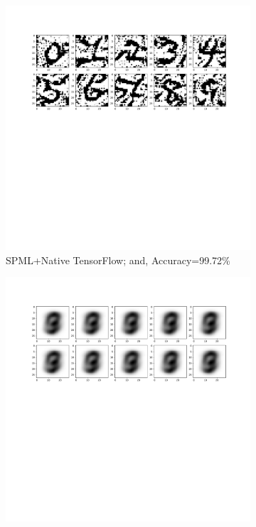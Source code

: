 \begin{figure}
\begin{subfigure}{.325\textwidth}
         \includegraphics[width=\textwidth]{images/Sim_attack/Mnistattack_native.pdf}
         \vspace{-8em}
         \caption{SPML+Native TensorFlow; and, Accuracy=99.72\%}
         \label{fig:simEps0}
     \end{subfigure}
     \begin{subfigure}{.325\textwidth}
         \includegraphics[width=\textwidth]{images/Sim_attack/Mnistattack.2.pdf}

\end{subfigure}
\end{figure}
